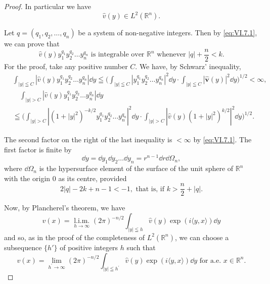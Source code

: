 \begin{proof}
In particular we have 
\begin{equation}\tag{1'}\label{eq:VI.7.1'}
\hat {v} (y) \in L ^{2} (\mathbb{R}^{n}).
\end{equation}

Let $q = (q_{1}, q_{2}, \ldots, q_{n})$ be a system of non-negative integers. Then by \eqref{eq:VI.7.1}, we can prove that 
\begin{equation}\label{eq:VI.7.2}
\hat{v}(y) y_1^{q_1} y_2^{q_2} \ldots y_n^{q_n} \text{ is integrable over } \mathbb{R}^{n} \text{ whenever } |q| + \frac{n}{2} < k.
\end{equation}
For the proof, take any positive number $C$. We have, by Schwarz' inequality, 
\[
\begin{aligned}
&\int_{| y | \leqq C} \left| \hat {v} (y) y _{1} ^ {q _{1}} y _{2} ^ {q _{2}} \dots y _{n} ^ {q _{n}} \right| \dd y \leqq \Big (\int_{| y | \leqq C} \left| y _{1} ^ {q _{1}} y _{2} ^ {q _{2}} \dots y _{n} ^ {q _{n}} \right| ^{2} \dd y \cdot \int_{| y | \leqq C} \left| \hat {\pmb v} (y) \right| ^{2} \dd y \Big) ^{1/2} < \infty , \\
&\quad \int_{|y|>C} \left| \hat {v} (y) y _{1} ^ {q _{1}} y _{2} ^ {q _{2}} \dots y _{n} ^ {q _{n}} \right| \dd y \\
&\leqq \Big (\int_{|y|>C} \left| (1 + | y | ^{2}) ^{-k/2} y _{1} ^ {q _{1}} y _{2} ^ {q _{2}} \dots y _{n} ^ {q _{n}} \right| ^{2} \dd y \cdot \int_{|y|>C} \left| \hat {v} (y) (1 + | y | ^{2}) ^{k/2} \right| ^{2} \dd y \Big) ^{1/2}.
\end{aligned}
\]

The second factor on the right of the last inequality is $< \infty$ by \eqref{eq:VI.7.1}. The first factor is finite by 
\[
\dd y = \dd y _{1} \dd y _{2} \dots \dd y _{n} = r ^{n-1} \dd r \dd \Omega_{n},
\]
where $\dd\Omega_{n}$ is the hypersurface element of the surface of the unit sphere of $\mathbb{R}^{n}$ with the origin $0$ as its centre, provided 
\begin{equation}\label{eq:VI.7.3}
2 | q | - 2 k + n - 1 < - 1, \text{ that is, if } k > \frac {n}{2} + | q |.
\end{equation}

Now, by Plancherel's theorem, we have 
\[
v (x) = \underset {h \rightarrow \infty} {\text{ l.i.m. }} (2 \pi) ^{-n/2} \int_{| y | \leqq h} \hat {v} (y) \exp (i \langle y, x \rangle) \dd y
\]
and so, as in the proof of the completeness of $L^2(\mathbb{R}^{n})$, we can choose a subsequence $\{h'\}$ of positive integers $h$ such that 
\[
v (x) = \lim\limits _ {h ^{\prime} \rightarrow \infty} (2 \pi) ^{-n/2} \int_ {| y | \leqq h ^{\prime}} \hat {v} (y) \exp (i \langle y, x \rangle) \dd y \text{ for a.e. } x \in \mathbb{R}^{n}.
\]


\end{proof}
